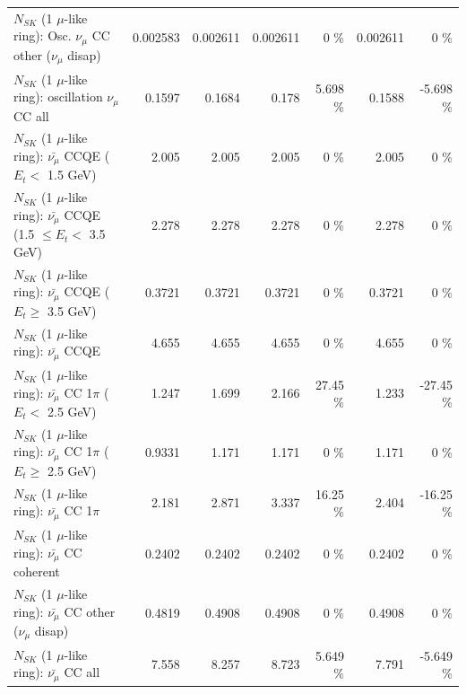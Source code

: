\begin{table}
\begin{tabular}{| l | r | r | r  r | r  r |}
         $N_{SK}$ (1 $\mu$-like ring): Osc. $\nu_\mu$ CC other ($\nu_\mu$ disap) &        0.002583 &        0.002611 &        0.002611 &        0 \%  &        0.002611 &        0 \%  \\ 
                      $N_{SK}$ (1 $\mu$-like ring): oscillation $\nu_\mu$ CC all &          0.1597 &          0.1684 &           0.178 &    5.698 \%  &          0.1588 &   -5.698 \%  \\ 
\hline
\hline
          $N_{SK}$ (1 $\mu$-like ring): $\bar{\nu_\mu}$ CCQE ($E_{t} <$ 1.5 GeV) &           2.005 &           2.005 &           2.005 &        0 \%  &           2.005 &        0 \%  \\ 
 $N_{SK}$ (1 $\mu$-like ring): $\bar{\nu_\mu}$ CCQE (1.5 $\leq E_{t} <$ 3.5 GeV) &           2.278 &           2.278 &           2.278 &        0 \%  &           2.278 &        0 \%  \\ 
       $N_{SK}$ (1 $\mu$-like ring): $\bar{\nu_\mu}$ CCQE ($E_{t} \geq$ 3.5 GeV) &          0.3721 &          0.3721 &          0.3721 &        0 \%  &          0.3721 &        0 \%  \\ 
\hline
                              $N_{SK}$ (1 $\mu$-like ring): $\bar{\nu_\mu}$ CCQE &           4.655 &           4.655 &           4.655 &        0 \%  &           4.655 &        0 \%  \\ 
\hline
     $N_{SK}$ (1 $\mu$-like ring): $\bar{\nu_\mu}$ CC 1$\pi$ ($E_{t} <$ 2.5 GeV) &           1.247 &           1.699 &           2.166 &    27.45 \%  &           1.233 &   -27.45 \%  \\ 
  $N_{SK}$ (1 $\mu$-like ring): $\bar{\nu_\mu}$ CC 1$\pi$ ($E_{t} \geq$ 2.5 GeV) &          0.9331 &           1.171 &           1.171 &        0 \%  &           1.171 &        0 \%  \\ 
\hline
                         $N_{SK}$ (1 $\mu$-like ring): $\bar{\nu_\mu}$ CC 1$\pi$ &           2.181 &           2.871 &           3.337 &    16.25 \%  &           2.404 &   -16.25 \%  \\ 
                       $N_{SK}$ (1 $\mu$-like ring): $\bar{\nu_\mu}$ CC coherent &          0.2402 &          0.2402 &          0.2402 &        0 \%  &          0.2402 &        0 \%  \\ 
        $N_{SK}$ (1 $\mu$-like ring): $\bar{\nu_\mu}$ CC other ($\nu_\mu$ disap) &          0.4819 &          0.4908 &          0.4908 &        0 \%  &          0.4908 &        0 \%  \\ 
                          $N_{SK}$ (1 $\mu$-like ring): $\bar{\nu_{\mu}}$ CC all &           7.558 &           8.257 &           8.723 &    5.649 \%  &           7.791 &   -5.649 \%  \\ 

\end{tabular}
\end{table}
